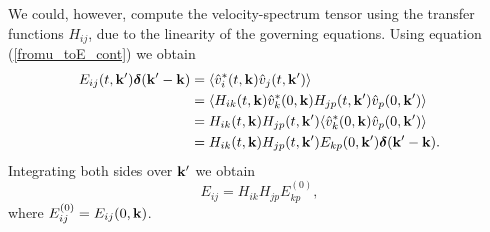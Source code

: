 \documentclass[oneside,a4paper,11pt]{report}
\begin{document}
We could, however, compute the velocity-spectrum tensor using the transfer functions $H_{ij}$, due to the linearity of the governing equations. Using equation (\ref{fromu_toE_cont}) we obtain
\begin{align}
E_{ij}(t,\mathbf{k}') \boldsymbol{\delta}(\mathbf{k}' - \mathbf{k}) & = \langle \hat{v}^*_i(t,\mathbf{k}) \hat{v}_j(t,\mathbf{k}') \rangle \nonumber \\
& = \langle H_{ik}(t,\mathbf{k}) \hat{v}_k^*(0,\mathbf{k}) H_{jp}(t,\mathbf{k}') \hat{v}_p(0,\mathbf{k}') \rangle \nonumber \\
& = H_{ik}(t,\mathbf{k}) H_{jp}(t,\mathbf{k}') \langle \hat{v}_k^*(0,\mathbf{k}) \hat{v}_p(0,\mathbf{k}') \rangle \nonumber \\
& = H_{ik}(t,\mathbf{k}) H_{jp}(t,\mathbf{k}') E_{kp}(0,\mathbf{k}') \boldsymbol{\delta}(\mathbf{k}' - \mathbf{k}).
\end{align}
Integrating both sides over $\mathbf{k}'$ we obtain
\begin{equation}
E_{ij} = H_{ik} H_{jp} E_{kp}^{(0)},
\end{equation}
where $E_{ij}^{(0)} = E_{ij}(0,\mathbf{k})$.
\end{document}
